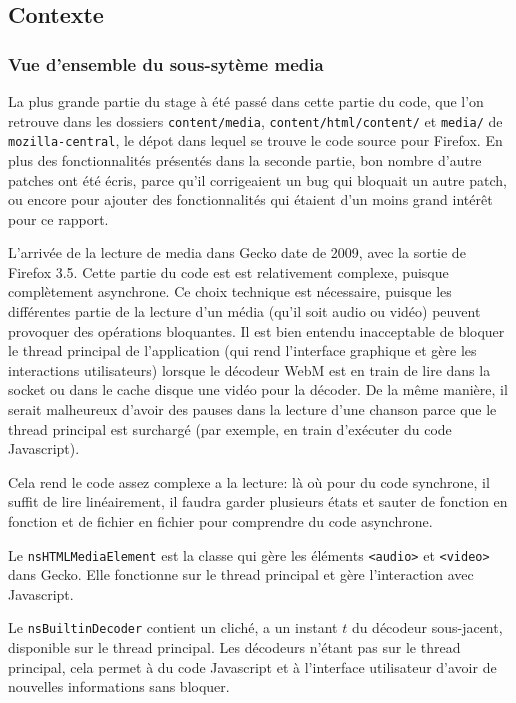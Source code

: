 \documentclass[a4paper,10pt]{article}
\newcommand{\cc}[1]{\texttt{#1}}
\begin{document}
\begin{multicols}{2}
  \part{Contexte}
  \section{Vue d'ensemble du sous-sytème media}
  La plus grande partie du stage à été passé dans cette partie du code, que l'on
  retrouve dans les dossiers \cc{content/media}, \cc{content/html/content/} et
  \cc{media/} de \cc{mozilla-central}, le dépot dans lequel se trouve le code
  source pour Firefox. En plus des fonctionnalités présentés dans la seconde
  partie, bon nombre d'autre patches ont été écris, parce qu'il corrigeaient un
  bug qui \og bloquait \fg un autre patch, ou encore pour ajouter des
  fonctionnalités qui étaient d'un moins grand intérêt pour ce rapport.

  L'arrivée de la lecture de media dans Gecko date de 2009, avec la sortie de
  Firefox 3.5. Cette partie du code est est relativement complexe, puisque
  complètement asynchrone. Ce choix technique est nécessaire, puisque les
  différentes partie de la lecture d'un média (qu'il soit audio ou vidéo)
  peuvent provoquer des opérations bloquantes. Il est bien entendu inacceptable
  de bloquer le thread principal de l'application (qui rend l'interface
  graphique et gère les interactions utilisateurs) lorsque le décodeur WebM est
  en train de lire dans la socket ou dans le cache disque une vidéo pour la
  décoder. De la même manière, il serait malheureux d'avoir des pauses dans la
  lecture d'une chanson parce que le thread principal est surchargé (par
  exemple, en train d'exécuter du code Javascript).

  Cela rend le code assez complexe a la lecture: là où pour du code synchrone,
  il suffit de lire linéairement, il faudra garder plusieurs états et sauter de
  fonction en fonction et de fichier en fichier pour comprendre du code
  asynchrone.

  Le \cc{nsHTMLMediaElement} est la classe qui gère les éléments \cc{<audio>} et
  \cc{<video>} dans Gecko. Elle fonctionne sur le thread principal et gère
  l'interaction avec Javascript.

  Le \cc{nsBuiltinDecoder} contient un cliché, a un instant $t$ du décodeur
  sous-jacent, disponible sur le thread principal.  Les décodeurs n'étant pas
  sur le thread principal, cela permet à du code Javascript et à l'interface
  utilisateur d'avoir de nouvelles informations sans bloquer.


\end{multicols}
\end{document}
